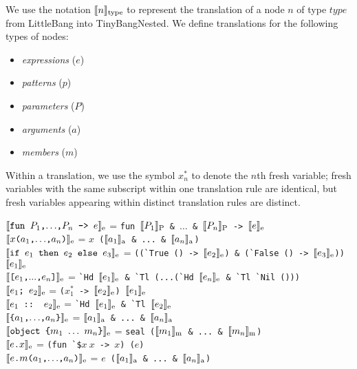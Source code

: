 \documentclass{article}
\begin{document}
\newcommand{\translate}[2]{\ensuremath{\llbracket\texttt{#2}\rrbracket_{\textnormal{#1}}}}
\newcommand{\fresh}[1]{\ensuremath{x^*_{#1}}}
\newcommand{\secheader}[1]{\par\noindent{\sc #1}\noindent\unskip}

We use the notation $\translate{type}{\ensuremath{n}}$ to represent the translation of a node $n$ of type $type$ from LittleBang into TinyBangNested.  We define translations for the following types of nodes:

\begin{itemize}
    \item \emph{expressions} ($e$)
    \item \emph{patterns} ($p$)
    \item \emph{parameters} ($P$)
    \item \emph{arguments} ($a$)
    \item \emph{members} ($m$)
\end{itemize}

Within a translation, we use the symbol $\fresh{n}$ to denote the $n$th fresh variable; fresh variables with the same subscript within one translation rule are identical, but fresh variables appearing within distinct translation rules are distinct.

\vspace*{3mm}
\secheader{Expressions}

\translate{e}{fun $P_1$,$\ldots$,$P_n$ -> $e$} = \verb|fun |\translate{P}{$P_1$}\verb| & |$\ldots$\verb| & |\translate{P}{$P_n$}\verb| -> |\translate{e}{$e$} \\
\translate{e}{$x$\texttt{(}$a_1$,$\ldots$,$a_n$\texttt{)}} = $x$\verb| (|\translate{a}{$a_1$}\verb| & ... & |\translate{a}{$a_n$}\verb|)|\\
\translate{e}{if $e_1$ then $e_2$ else $e_3$} = \verb|((`True () -> |\translate{e}{$e_2$}\verb|) & (`False () -> |\translate{e}{$e_3$}\verb|)) |\translate{e}{$e_1$}\\
\translate{e}{[$e_1$,$...$,$e_n$]} = \verb|`Hd |\translate{e}{$e_1$}\verb| & `Tl (...(`Hd |\translate{e}{$e_n$}\verb| & `Tl `Nil ()))|\\
\translate{e}{$e_1$; $e_2$} = \verb|(|\fresh{1}\verb| -> |\translate{e}{$e_2$}\verb|) |\translate{e}{$e_1$}\\
\translate{e}{$e_1$ :: $e_2$} = \verb|`Hd |\translate{e}{$e_1$}\verb| & `Tl |\translate{e}{$e_2$}\\
\translate{e}{\char`\{$a_1$,$\ldots$,$a_n$\char`\}} = \translate{a}{$a_1$}\verb| & ... & |\translate{a}{$a_n$}\\
\translate{e}{object \char`\{$m_1$ $\ldots$ $m_n$\char`\}} = \verb|seal (|\translate{m}{$m_1$}\verb| & ... & |\translate{m}{$m_n$}\verb|)|\\
\translate{e}{$e$.$x$} = \verb|(fun `$|$x~x$\verb| -> |$x$\verb|) (|$e$\verb|)| \\
\translate{e}{$e$.$m$($a_1$,$\ldots$,$a_n$)} = $e$\verb! (!\translate{a}{$a_1$}\verb| & ... & |\translate{a}{$a_n$}\verb!)! \\
\end{document}
